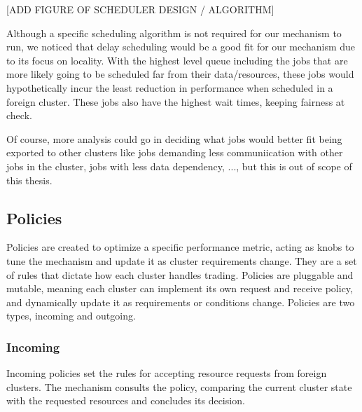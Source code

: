 [ADD FIGURE OF SCHEDULER DESIGN / ALGORITHM]

Although a specific scheduling algorithm is not required for our mechanism to
run, we noticed that delay scheduling would be a good fit for our mechanism due
to its focus on locality. With the highest level queue including the jobs that
are more likely going to be scheduled far from their data/resources, these jobs
would hypothetically incur the least reduction in performance when scheduled in
a foreign cluster. These jobs also have the highest wait times, keeping
fairness at check. 

Of course, more analysis could go in deciding what jobs would better fit being
exported to other clusters like jobs demanding less communiication with other
jobs in the cluster, jobs with less data dependency, ..., but this is out of
scope of this thesis.


\subsection{Policies}

Policies are created to optimize a specific performance metric, acting as knobs
to tune the mechanism and update it as cluster requirements change. They are a
set of rules that dictate how each cluster handles trading. Policies are
pluggable and mutable, meaning each cluster can implement its own request and
receive policy, and dynamically update it as requirements or conditions change.
Policies are two types, incoming and outgoing. 

\subsubsection{Incoming} 

Incoming policies set the rules for accepting resource requests from foreign
clusters. The mechanism consults the policy, comparing the current cluster
state with the requested resources and concludes its decision.

